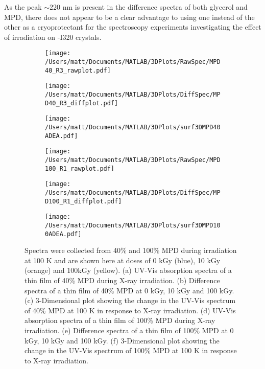 As the peak $\sim$220 nm is present in the difference spectra of both glycerol and MPD, there does not appear to be a clear advantage to using one instead of the other as a cryoprotectant for the spectroscopy experiments investigating the effect of irradiation on \atpdx -I320 crystals.    
  
\begin{figure}[!htbp]
\centering
\begin{subfigure}{.33\textwidth}
  \centering
  \texttt{[image: /Users/matt/Documents/MATLAB/3DPlots/RawSpec/MPD40\_R3\_rawplot.pdf]}
  \caption{}
  \label{fig:MPD40_raw}
\end{subfigure}%
\begin{subfigure}{.33\textwidth}
  \centering
  \texttt{[image: /Users/matt/Documents/MATLAB/3DPlots/DiffSpec/MPD40\_R3\_diffplot.pdf]}
  \caption{}
  \label{fig:MPD40_diff}
\end{subfigure}
\begin{subfigure}{.33\textwidth}
  \centering
  \texttt{[image: /Users/matt/Documents/MATLAB/3DPlots/surf3DMPD40ADEA.pdf]}
  \caption{}
  \label{fig:MPD40_3Dplot}
\end{subfigure}
\begin{subfigure}{.33\textwidth}
  \centering
  \texttt{[image: /Users/matt/Documents/MATLAB/3DPlots/RawSpec/MPD100\_R1\_rawplot.pdf]}
  \caption{}
  \label{fig:MPD100_raw}
\end{subfigure}%
\begin{subfigure}{.33\textwidth}
  \centering
  \texttt{[image: /Users/matt/Documents/MATLAB/3DPlots/DiffSpec/MPD100\_R1\_diffplot.pdf]}
  \caption{}
  \label{fig:MPD100_diff}
\end{subfigure}
\begin{subfigure}{.33\textwidth}
  \centering
  \texttt{[image: /Users/matt/Documents/MATLAB/3DPlots/surf3DMPD100ADEA.pdf]}
  \caption{}
  \label{fig:MPD100_3Dplot}
\end{subfigure}
\caption[UV-Vis Spectra of X-ray irradiated 40\% and 100\% MPD]{Spectra were collected from 40\%  and 100\% MPD during irradiation at 100 K and are shown here at doses of 0 kGy (blue), 10 kGy (orange) and 100kGy (yellow). (a) UV-Vis absorption spectra of a thin film of 40\% MPD during X-ray irradiation. (b) Difference spectra of a thin film of 40\% MPD at 0 kGy, 10 kGy and 100 kGy. (c) 3-Dimensional plot showing the change in the UV-Vis spectrum of 40\% MPD at 100 K in response to X-ray irradiation. (d) UV-Vis absorption spectra of a thin film of 100\% MPD during X-ray irradiation. (e) Difference spectra of a thin film of 100\% MPD at 0 kGy, 10 kGy and 100 kGy. (f) 3-Dimensional plot showing the change in the UV-Vis spectrum of 100\% MPD at 100 K in response to X-ray irradiation.}
\end{figure}  


